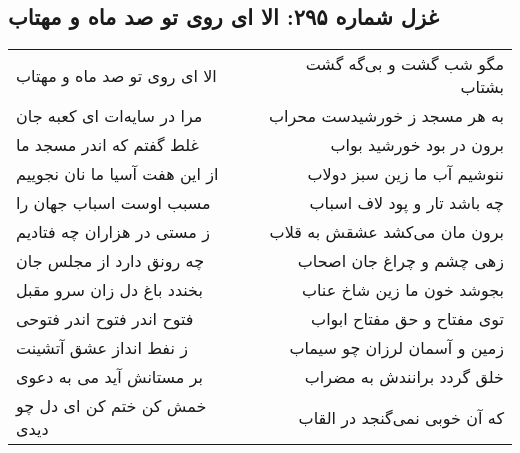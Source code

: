 \begin{center}
\section*{غزل شماره ۲۹۵: الا ای روی تو صد ماه و مهتاب}
\label{sec:0295}
\begin{longtable}{l p{0.5cm} r}
الا ای روی تو صد ماه و مهتاب
&&
مگو شب گشت و بی‌گه گشت بشتاب
\\
مرا در سایه‌ات ای کعبه جان
&&
به هر مسجد ز خورشیدست محراب
\\
غلط گفتم که اندر مسجد ما
&&
برون در بود خورشید بواب
\\
از این هفت آسیا ما نان نجوییم
&&
ننوشیم آب ما زین سبز دولاب
\\
مسبب اوست اسباب جهان را
&&
چه باشد تار و پود لاف اسباب
\\
ز مستی در هزاران چه فتادیم
&&
برون مان می‌کشد عشقش به قلاب
\\
چه رونق دارد از مجلس جان
&&
زهی چشم و چراغ جان اصحاب
\\
بخندد باغ دل زان سرو مقبل
&&
بجوشد خون ما زین شاخ عناب
\\
فتوح اندر فتوح اندر فتوحی
&&
توی مفتاح و حق مفتاح ابواب
\\
ز نفط انداز عشق آتشینت
&&
زمین و آسمان لرزان چو سیماب
\\
بر مستانش آید می به دعوی
&&
خلق گردد برانندش به مضراب
\\
خمش کن ختم کن ای دل چو دیدی
&&
که آن خوبی نمی‌گنجد در القاب
\\
\end{longtable}
\end{center}
